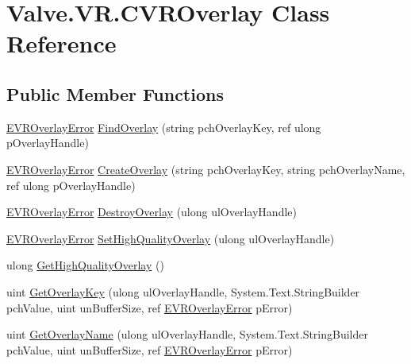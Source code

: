 \hypertarget{class_valve_1_1_v_r_1_1_c_v_r_overlay}{}\section{Valve.\+V\+R.\+C\+V\+R\+Overlay Class Reference}
\label{class_valve_1_1_v_r_1_1_c_v_r_overlay}
\subsection*{Public Member Functions}
\begin{DoxyCompactItemize}
\item 
\mbox{\hyperlink{namespace_valve_1_1_v_r_aaee5c5144f42b7969d45b854f51b0c18}{E\+V\+R\+Overlay\+Error}} \mbox{\hyperlink{class_valve_1_1_v_r_1_1_c_v_r_overlay_ab5ba01ab05993d19f36d985909c71677}{Find\+Overlay}} (string pch\+Overlay\+Key, ref ulong p\+Overlay\+Handle)
\item 
\mbox{\hyperlink{namespace_valve_1_1_v_r_aaee5c5144f42b7969d45b854f51b0c18}{E\+V\+R\+Overlay\+Error}} \mbox{\hyperlink{class_valve_1_1_v_r_1_1_c_v_r_overlay_a4b1c60e2e0e778f30b2a39a987f96de5}{Create\+Overlay}} (string pch\+Overlay\+Key, string pch\+Overlay\+Name, ref ulong p\+Overlay\+Handle)
\item 
\mbox{\hyperlink{namespace_valve_1_1_v_r_aaee5c5144f42b7969d45b854f51b0c18}{E\+V\+R\+Overlay\+Error}} \mbox{\hyperlink{class_valve_1_1_v_r_1_1_c_v_r_overlay_a6bbcbda8364751a199a9219de2142f23}{Destroy\+Overlay}} (ulong ul\+Overlay\+Handle)
\item 
\mbox{\hyperlink{namespace_valve_1_1_v_r_aaee5c5144f42b7969d45b854f51b0c18}{E\+V\+R\+Overlay\+Error}} \mbox{\hyperlink{class_valve_1_1_v_r_1_1_c_v_r_overlay_a0f3ea42dac819a5fa592161da610c194}{Set\+High\+Quality\+Overlay}} (ulong ul\+Overlay\+Handle)
\item 
ulong \mbox{\hyperlink{class_valve_1_1_v_r_1_1_c_v_r_overlay_a26e9c3454ecc7acb77311e21b0c1da6b}{Get\+High\+Quality\+Overlay}} ()
\item 
uint \mbox{\hyperlink{class_valve_1_1_v_r_1_1_c_v_r_overlay_aa566bde97a99b71d8c98eb34b5849646}{Get\+Overlay\+Key}} (ulong ul\+Overlay\+Handle, System.\+Text.\+String\+Builder pch\+Value, uint un\+Buffer\+Size, ref \mbox{\hyperlink{namespace_valve_1_1_v_r_aaee5c5144f42b7969d45b854f51b0c18}{E\+V\+R\+Overlay\+Error}} p\+Error)
\item 
uint \mbox{\hyperlink{class_valve_1_1_v_r_1_1_c_v_r_overlay_a98e6c5c559481da0602375dcd09276c0}{Get\+Overlay\+Name}} (ulong ul\+Overlay\+Handle, System.\+Text.\+String\+Builder pch\+Value, uint un\+Buffer\+Size, ref \mbox{\hyperlink{namespace_valve_1_1_v_r_aaee5c5144f42b7969d45b854f51b0c18}{E\+V\+R\+Overlay\+Error}} p\+Error)

\end{DoxyCompactItemize}
